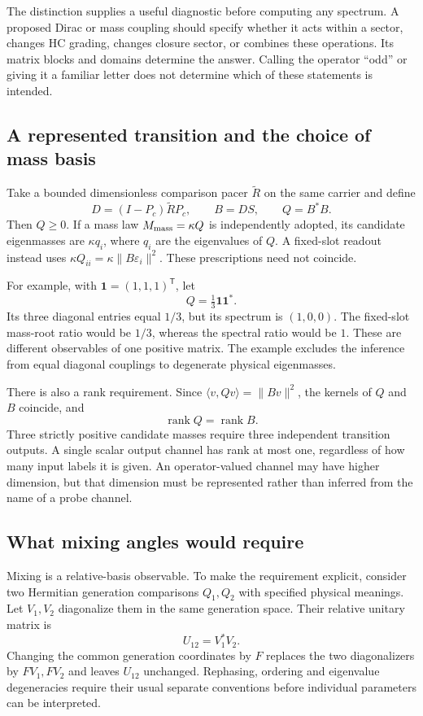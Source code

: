 The distinction supplies a useful diagnostic before computing any
spectrum. A proposed Dirac or mass coupling should specify whether
it acts within a sector, changes HC grading, changes closure sector,
or combines these operations. Its matrix blocks and domains determine
the answer. Calling the operator ``odd'' or giving it a familiar
letter does not determine which of these statements is intended.

\subsection{A represented transition and the choice of mass basis}
Take a bounded dimensionless comparison pacer $\widetilde R$ on the
same carrier and define
\begin{equation}
 D=(I-P_c)\widetilde R P_c,\qquad B=DS,\qquad Q=B^*B.
\end{equation}
Then $Q\geq0$. If a mass law $M_{\rm mass}=\kappa Q$ is independently
adopted, its candidate eigenmasses are $\kappa q_i$, where $q_i$
are the eigenvalues of $Q$. A fixed-slot readout instead uses
$\kappa Q_{ii}=\kappa\|B\varepsilon_i\|^2$. These prescriptions
need not coincide.

For example, with $\boldsymbol1=(1,1,1)^{\mathsf T}$, let
\begin{equation}
 Q=\tfrac13\boldsymbol1\boldsymbol1^*.
\end{equation}
Its three diagonal entries equal $1/3$, but its spectrum is $(1,0,0)$.
The fixed-slot mass-root ratio would be $1/3$, whereas the spectral
ratio would be $1$. These are different observables of one positive
matrix. The example excludes the inference from equal diagonal
couplings to degenerate physical eigenmasses.

There is also a rank requirement. Since
$\langle v,Qv\rangle=\|Bv\|^2$, the kernels of $Q$ and $B$
coincide, and
\begin{equation}
 \operatorname{rank}Q=\operatorname{rank}B.
\end{equation}
Three strictly positive candidate masses require three independent
transition outputs. A single scalar output channel has rank at most
one, regardless of how many input labels it is given. An operator-valued
channel may have higher dimension, but that dimension must be represented
rather than inferred from the name of a probe channel.

\subsection{What mixing angles would require}
Mixing is a relative-basis observable. To make the requirement explicit,
consider two Hermitian generation comparisons $Q_1,Q_2$ with specified
physical meanings. Let $V_1,V_2$ diagonalize them in the same generation
space. Their relative unitary matrix is
\begin{equation}
 U_{12}=V_1^*V_2.
\end{equation}
Changing the common generation coordinates by $F$ replaces the two
diagonalizers by $FV_1,FV_2$ and leaves $U_{12}$ unchanged. Rephasing,
ordering and eigenvalue degeneracies require their usual separate
conventions before individual parameters can be interpreted.

